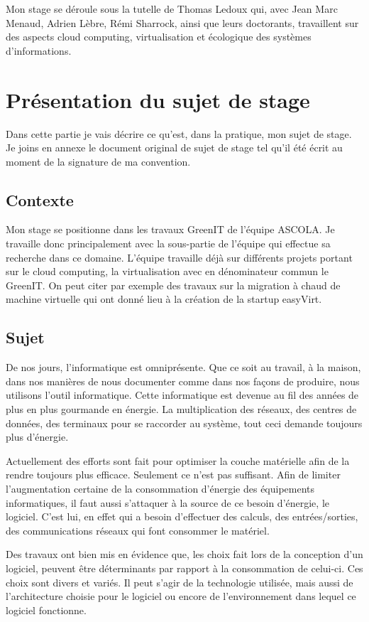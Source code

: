 \documentclass[a4paper, 11pt]{report}
\begin{document}
Mon stage se déroule sous la tutelle de Thomas Ledoux qui, avec Jean Marc Menaud, Adrien Lèbre, Rémi Sharrock, ainsi que leurs doctorants, travaillent sur des aspects cloud computing, virtualisation et écologique des systèmes d'informations.

	\section{Présentation du sujet de stage}
Dans cette partie je vais décrire ce qu'est, dans la pratique, mon sujet de stage. Je joins en annexe le document original de sujet de stage tel qu'il été écrit au moment de la signature de ma convention.

		\subsection{Contexte}
Mon stage se positionne dans les travaux GreenIT de l’équipe ASCOLA. Je travaille donc principalement avec la sous-partie de l'équipe qui effectue sa recherche dans ce domaine. L'équipe travaille déjà sur différents projets portant sur le cloud computing, la virtualisation avec en dénominateur commun le GreenIT. On peut citer par exemple des travaux sur la migration à chaud de machine virtuelle qui ont donné lieu à la création de la startup easyVirt.

		\subsection{Sujet}
De nos jours, l'informatique est omniprésente. Que ce soit au travail, à la maison, dans nos manières de nous documenter comme dans nos façons de produire, nous utilisons l'outil informatique. Cette informatique est devenue au fil des années de plus en plus gourmande en énergie. La multiplication des réseaux, des centres de données, des terminaux pour se raccorder au système, tout ceci demande toujours plus d'énergie.

Actuellement des efforts sont fait pour optimiser la couche matérielle afin de la rendre toujours plus efficace. Seulement ce n'est pas suffisant. Afin de limiter l'augmentation certaine de la consommation d'énergie des équipements informatiques, il faut aussi s'attaquer à la source de ce besoin d'énergie, le logiciel. C'est lui, en effet qui a besoin d'effectuer des calculs, des entrées/sorties, des communications réseaux qui font consommer le matériel.

Des travaux ont bien mis en évidence que, les choix fait lors de la conception d'un logiciel, peuvent être déterminants par rapport à la consommation de celui-ci. Ces choix sont divers et variés. Il peut s'agir de la technologie utilisée, mais aussi de l'architecture choisie pour le logiciel ou encore de l'environnement dans lequel ce logiciel fonctionne.
\end{document}
